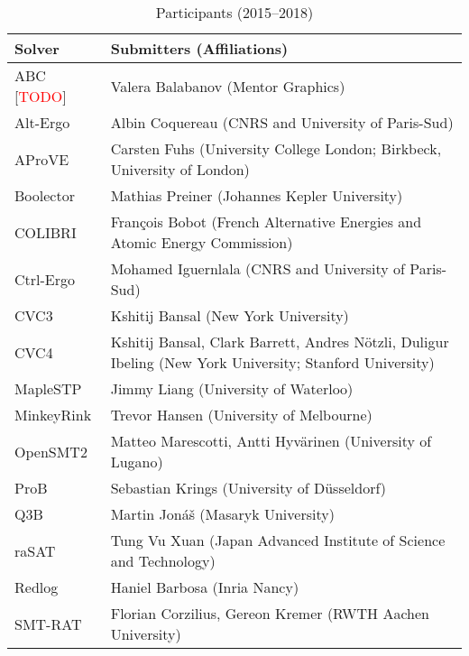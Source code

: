 \documentclass[twoside,11pt]{article}
\newcommand{\TODO}[0]{\textcolor{red}{TODO}}
\begin{document}
\begin{table}
  \caption{Participants (2015--2018)}
  \label{table:participants}
  \centering
  \begin{tabular}{|l|p{13cm}|} %
    \hline
    Solver & Submitters (Affiliations)\\
    \hline
    ABC [\TODO]       & Valera Balabanov
                        (Mentor Graphics)\\
    Alt-Ergo          & Albin Coquereau
                        (CNRS and University of Paris-Sud)\\
    AProVE            & Carsten Fuhs
                        (University College London; Birkbeck, University of London)\\
    Boolector         & Mathias Preiner
                        (Johannes Kepler University)\\
    COLIBRI           & Fran\c{c}ois Bobot
                        (French Alternative Energies and Atomic Energy Commission)\\
    Ctrl-Ergo         & Mohamed Iguernlala
                        (CNRS and University of Paris-Sud)\\
    CVC3              & Kshitij Bansal
                        (New York University)\\
    CVC4              & Kshitij Bansal, Clark Barrett, Andres N\"otzli, Duligur Ibeling
                        (New York University; Stanford University)\\
    MapleSTP          & Jimmy Liang
                        (University of Waterloo)\\
    MinkeyRink        & Trevor Hansen
                        (University of Melbourne)\\
    OpenSMT2          & Matteo Marescotti, Antti Hyv\"arinen
                        (University of Lugano)\\
    ProB              & Sebastian Krings
                        (University of D\"usseldorf)\\
    Q3B               & Martin Jon\'a\v{s}
                        (Masaryk University)\\
    raSAT             & Tung Vu Xuan
                        (Japan Advanced Institute of Science and Technology)\\
    Redlog            & Haniel Barbosa
                        (Inria Nancy)\\
    SMT-RAT           & Florian Corzilius, Gereon Kremer
                        (RWTH Aachen University)\\

\end{tabular}
\end{table}
\end{document}
